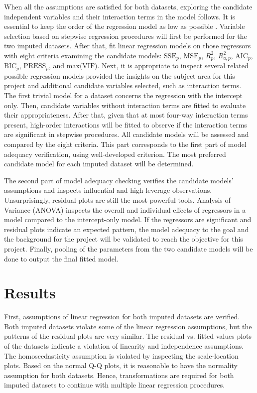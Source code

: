 \documentclass[11pt]{article}
\begin{document}
When all the assumptions are satisfied for both datasets, exploring the candidate independent variables and their interaction terms in the model follows. It is essential to keep the order of the regression model as low as possible \cite{bk:kutner, bk:montgomery}. Variable selection based on stepwise regression procedures will first be performed for the two imputed datasets. After that, fit linear regression models on those regressors with eight criteria examining the candidate models: $\textrm{SSE}_p$, $\textrm{MSE}_p$, $R_p^2$, $R_{a, p}^2$, $\textrm{AIC}_p$, $\textrm{BIC}_p$, $\textrm{PRESS}_p$, and $\textrm{max(VIF)}$. Next, it is appropriate to inspect several related possible regression models provided the insights on the subject area for this project and additional candidate variables selected, such as interaction terms. The first trivial model for a dataset concerns the regression with the intercept only. Then, candidate variables without interaction terms are fitted to evaluate their appropriateness. After that, given that at most four-way interaction terms present, high-order interactions will be fitted to observe if the interaction terms are significant in stepwise procedures. All candidate models will be assessed and compared by the eight criteria. This part corresponds to the first part of model adequacy verification, using well-developed criterion. The most preferred candidate model for each imputed dataset will be determined.

The second part of model adequacy checking verifies the candidate models' assumptions and inspects influential and high-leverage observations. Unsurprisingly, residual plots are still the most powerful tools. Analysis of Variance (ANOVA) inspects the overall and individual effects of regressors in a model compared to the intercept-only model. If the regressors are significant and residual plots indicate an expected pattern, the model adequacy to the goal and the background for the project will be validated to reach the objective for this project. Finally, pooling of the parameters from the two candidate models will be done to output the final fitted model.

\section{Results}
First, assumptions of linear regression for both imputed datasets are verified. Both imputed datasets violate some of the linear regression assumptions, but the patterns of the residual plots are very similar. The residual vs. fitted values plots of the datasets indicate a violation of linearity and independence assumptions. The homoscedasticity assumption is violated by inspecting the scale-location plots. Based on the normal Q-Q plots, it is reasonable to have the normality assumption for both datasets. Hence, transformations are required for both imputed datasets to continue with multiple linear regression procedures.
\end{document}
